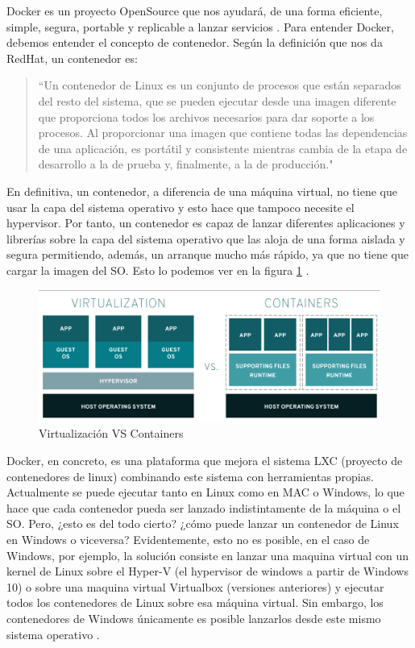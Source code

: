 Docker es un proyecto OpenSource que nos ayudará, de una forma eficiente, simple, segura, portable y replicable a lanzar servicios \cite{Dck-5} \cite{Dck-6}. Para entender Docker, debemos entender el concepto de contenedor. Según la definición que nos da RedHat, un contenedor es:\par
\begin{quote}

\small ``Un contenedor de Linux es un conjunto de procesos que están separados del resto del sistema, que se pueden ejecutar desde una imagen diferente que proporciona todos los archivos necesarios para dar soporte a los procesos. Al proporcionar una imagen que contiene todas las dependencias de una aplicación, es portátil y consistente mientras cambia de la etapa de desarrollo a la de prueba y, finalmente, a la de producción."\cite{Dck-7}\par

\end{quote}
En definitiva, un contenedor, a diferencia de una máquina virtual, no tiene que usar la capa del sistema operativo y esto hace que tampoco necesite el hypervisor. Por tanto, un contenedor es capaz de lanzar diferentes aplicaciones y librerías sobre la capa del sistema operativo que las aloja de una forma aislada y segura permitiendo, además, un arranque mucho más rápido, ya que no tiene que cargar la imagen del SO. Esto lo podemos ver en la figura \ref{dock-1} \cite{Dck-7}.\par

\begin{figure}[htp]
\centering
\includegraphics[scale=0.45]{Imagenes/dockervsvm1.png}
\caption{Virtualización VS Containers}
\label{dock-1}
\end{figure}

Docker, en concreto, es una plataforma que mejora el sistema LXC (proyecto de contenedores de linux) combinando este sistema con herramientas propias. Actualmente se puede ejecutar tanto en Linux como en MAC o Windows, lo que hace que cada contenedor pueda ser lanzado indistintamente de la máquina o el SO. Pero, ¿esto es del todo cierto? ¿cómo puede lanzar un contenedor de Linux en Windows o viceversa? Evidentemente, esto no es posible, en el caso de Windows, por ejemplo, la solución consiste en lanzar una maquina virtual con un kernel de Linux sobre el Hyper-V (el hypervisor de windows a partir de Windows 10) o sobre una maquina virtual Virtualbox (versiones anteriores) y ejecutar todos los contenedores de Linux sobre esa máquina virtual. Sin embargo, los contenedores de Windows únicamente es posible lanzarlos desde este mismo sistema operativo \cite{Dck-10}. \par

